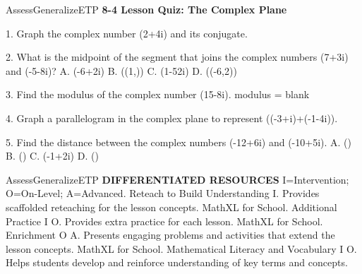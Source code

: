 \documentclass{article}
\newenvironment{te-addendum}[2]{}{}     %
\newcommand{\answer}[1]{}               %
\newcommand{\placeholder}[2]{}          %
\newcommand{\te}[1]{}                   %
\begin{document}
\begin{te-addendum}{Assess}{GeneralizeETP}
\textbf{8-4 Lesson Quiz: The Complex Plane}
\te{ASSESSMENT RESOURCES. Name blank. enVision Algebra 2. SavvasRealize.com. Copyright© Savvas Learning Company LLC. All Rights Reserved. enVision Algebra 2 Assessment Sourcebook.}
1. Graph the complex number (2+4i) and its conjugate.
\answer{1. See graph.}
\placeholder{graph}{Magenta filled points (2,4),(2,-4), labeled 2+4i and 2-4i. Black double-arrowed real and imaginary axes, O origin, unit grid window [-5,5] on both axes, real labels -4,-2,2,4, imaginary labels -4,-2,2.}
2. What is the midpoint of the segment that joins the complex numbers (7+3i) and (-5-8i)?
A. (-6+2i)
B. ((1,))
C. (1-\frac52i)
D. ((-6,2))
\answer{2. C}
3. Find the modulus of the complex number (15-8i).
modulus = blank
\answer{3. 17}
4. Graph a parallelogram in the complex plane to represent ((-3+i)+(-1-4i)).
\answer{4. See graph.}
\placeholder{graph}{Magenta parallelogram with filled vertices O,( -3,1),(-4,-3),(-1,-4), solid sides; sum vertex labeled -4-3i. Black double-arrowed real and imaginary axes, O origin, unit grid window [-5,5] on both axes, real labels -4,-2,2,4, imaginary label 2.}
5. Find the distance between the complex numbers (-12+6i) and (-10+5i).
A. ()
B. ()
C. (-1+2i)
D. ()
\answer{5. B}
\end{te-addendum}
\begin{te-addendum}{Assess}{GeneralizeETP}
\textbf{DIFFERENTIATED RESOURCES}
I=Intervention; O=On-Level; A=Advanced.
Reteach to Build Understanding I. Provides scaffolded reteaching for the lesson concepts. MathXL for School.
Additional Practice I O. Provides extra practice for each lesson. MathXL for School.
Enrichment O A. Presents engaging problems and activities that extend the lesson concepts. MathXL for School.
Mathematical Literacy and Vocabulary I O. Helps students develop and reinforce understanding of key terms and concepts.
\te{Resource sheets each print Name blank, enVision Algebra 2, SavvasRealize.com, lesson title The Complex Plane, Copyright© Savvas Learning Company LLC. All Rights Reserved., and enVision Algebra 2 Teaching Resources.}
\end{te-addendum}
\end{document}
